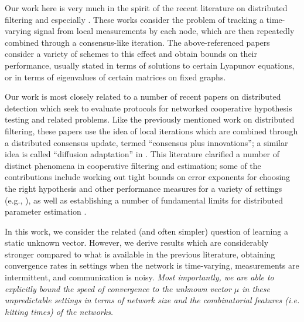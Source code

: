 \documentclass[final]{siamltex}
\begin{document}
Our work here is very much in the spirit of the recent literature on distributed filtering \cite{olfati1, olfati2, olfati3, rantzer, sper, sayed1, sayed2, sayed3, moura1, moura6, diffadpt} and
especially \cite{carli}. These works consider the problem of tracking a time-varying signal from local measurements by each node, which are then repeatedly combined through
a consensus-like iteration. The above-referenced papers consider a variety of schemes to this effect and obtain bounds on their performance, usually stated in 
terms of solutions to certain Lyapunov equations, or in terms of eigenvalues of certain matrices on fixed graphs. 

Our work is most closely related to a number of recent papers on distributed detection \cite{moura1, moura2, moura3, moura5, moura6, moura7, moura8, moura9} which seek to evaluate protocols for networked cooperative hypothesis testing and related problems. Like the previously mentioned work on distributed filtering, these papers use the idea of local iterations which are combined through a distributed consensus update, termed ``consensus plus innovations''; a similar idea is called ``diffusion adaptation'' in \cite{diffadpt}. This literature clarified a number of distinct phenomena in cooperative filtering and estimation; some of the contributions include working out tight bounds on error exponents for choosing the right hypothesis and other performance measures for a variety of settings (e.g., \cite{moura2, moura3, moura5}), as well as establishing a number of fundamental limits for distributed parameter estimation \cite{moura7}. 

In this work, we consider the related (and often simpler) question of learning a static unknown vector. However, 
we derive results which are considerably stronger compared to what is available in the previous literature, obtaining convergence rates in settings when the network is time-varying, measurements are intermittent, and communication is noisy. {\em Most importantly, we are able to explicitly bound the speed of convergence to the unknown vector $\mu$ in these unpredictable settings in terms of network size and the combinatorial features (i.e. hitting times) of the networks.}

 
\end{document}
